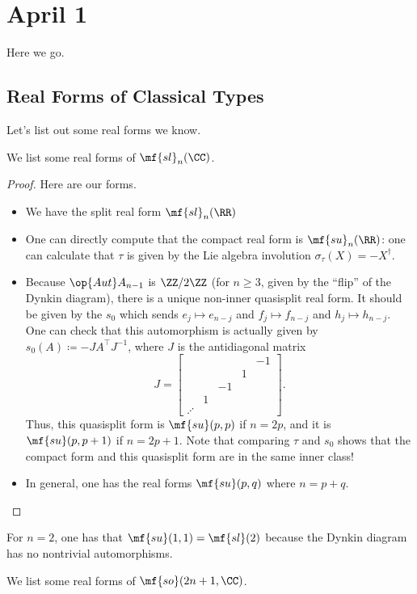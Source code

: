 \documentclass[../notes.tex]{subfiles}
\begin{document}
\section{April 1}
Here we go.

\subsection{Real Forms of Classical Types}
Let's list out some real forms we know.
\begin{exe}
	We list some real forms of $\mf{sl}_n(\CC)$.
\end{exe}
\begin{proof}
	Here are our forms.
	\begin{itemize}
		\item We have the split real form $\mf{sl}_n(\RR)$
		\item One can directly compute that the compact real form is $\mf{su}_n(\RR)$: one can calculate that $\tau$ is given by the Lie algebra involution $\sigma_\tau(X)=-X^\dagger$.
		\item Because $\op{Aut}A_{n-1}$ is $\ZZ/2\ZZ$ (for $n\ge3$, given by the ``flip'' of the Dynkin diagram), there is a unique non-inner quasisplit real form. It should be given by the $s_0$ which sends $e_j\mapsto e_{n-j}$ and $f_j\mapsto f_{n-j}$ and $h_j\mapsto h_{n-j}$. One can check that this automorphism is actually given by $s_0(A)\coloneqq-JA^\intercal J^{-1}$, where $J$ is the antidiagonal matrix
		\[J=\begin{bmatrix}
			&&&& -1 \\
			&&& 1 \\
			&& -1 \\
			& 1 \\
			\iddots
		\end{bmatrix}.\]
		Thus, this quasisplit form is $\mf{su}(p,p)$ if $n=2p$, and it is $\mf{su}(p,p+1)$ if $n=2p+1$. Note that comparing $\tau$ and $s_0$ shows that the compact form and this quasisplit form are in the same inner class!
		\item In general, one has the real forms $\mf{su}(p,q)$ where $n=p+q$.
		\qedhere
	\end{itemize}
\end{proof}
\begin{remark}
	For $n=2$, one has that $\mf{su}(1,1)=\mf{sl}(2)$ because the Dynkin diagram has no nontrivial automorphisms.
\end{remark}
\begin{exe}
	We list some real forms of $\mf{so}(2n+1,\CC)$.
\end{exe}
\end{document}
